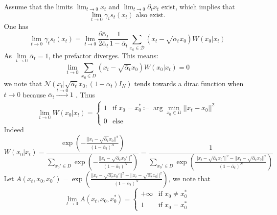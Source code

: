 \documentclass[a4paper,10pt]{article}
\theoremstyle{definition} %
\theoremstyle{definition} %
\theoremstyle{definition} %
\theoremstyle{definition} %
\newcommand{\0}{\boldsymbol{0}}
\begin{document}
Assume that the limits \( \lim_{t \to 0} x_t \) and \( \lim_{t \to 0} \partial_t x_t \) exist, which implies that
\[
\lim_{t \to 0} \gamma_t s_t(x_t) \text{ also exist.}
\]
One has
\begin{equation*}
    \lim\limits_{t \to 0} \gamma_t s_t (x_t) = \lim\limits_{t \to 0} \frac{\partial \bar{\alpha}_t}{2\bar{\alpha}_t} \frac{1}{1 - \bar{\alpha}_t} \sum\limits_{x_0 \in \mathcal{D}} \left( x_t - \sqrt{\bar{\alpha}_t} x_0 \right) W(x_0 | x_t)
\end{equation*}
As  $\lim\limits_{t \to 0} \bar{\alpha}_t = 1$, the prefactor diverges. This means:
\begin{equation*}
    \lim\limits_{t \to 0} \sum\limits_{x_0 \in D} (x_t - \sqrt{\bar{\alpha}_t} x_0) W(x_0 | x_t) = 0
\end{equation*}
we note that $\mathcal{N}(x_t | \sqrt{\bar{\alpha}_t} x_0, (1 - \bar{\alpha}_t) I_N)$ tends towards a dirac function when $t \to 0$ because $\bar{\alpha}_t \xrightarrow[]{t \to 0} 1$ . Thus
\begin{equation*}
    \lim\limits_{t \to 0} W(x_0 | x_t) =
\begin{cases} 
1 & \text{if } x_0 = x_0^* \coloneq \arg\min_{x_0 \in D} ||x_t - x_0||^2 \\
0 & \text{else}
\end{cases}
\end{equation*}
Indeed
\begin{equation*}
    W(x_0 | x_t) =
\frac{\exp\left( -\frac{||x_t - \sqrt{\bar{\alpha}_t} x_0||^2}{(1 - \bar{\alpha}_t)^N} \right)}
{\sum\limits_{x_0' \in D} \exp\left( -\frac{||x_t - \sqrt{\bar{\alpha}_t} x_0'||^2}{(1 - \bar{\alpha}_t)^N} \right)}
=\frac{1}{\sum\limits_{x_0' \in D} \exp\left( \frac{||x_t - \sqrt{\bar{\alpha}_t} x_0'||^2 - ||x_t - \sqrt{\bar{\alpha}_t} x_0||^2}{(1 - \bar{\alpha}_t)^N} \right)}
\end{equation*}
Let $A(x_t, x_0, x_0' ) = \exp\left( \frac{||x_t - \sqrt{\bar{\alpha}_t} x_0'||^2 - ||x_t - \sqrt{\bar{\alpha}_t} x_0||^2}{(1 - \bar{\alpha}_t)^N} \right)$, we note that
\begin{equation*}
    \lim\limits_{t \to 0} A(x_t, x_0, x_0^*) =
\begin{cases} 
+\infty & \text{if } x_0 \neq x_0^* \\
1 & \text{if } x_0 = x_0^*
\end{cases}
\end{equation*}
\end{document}
